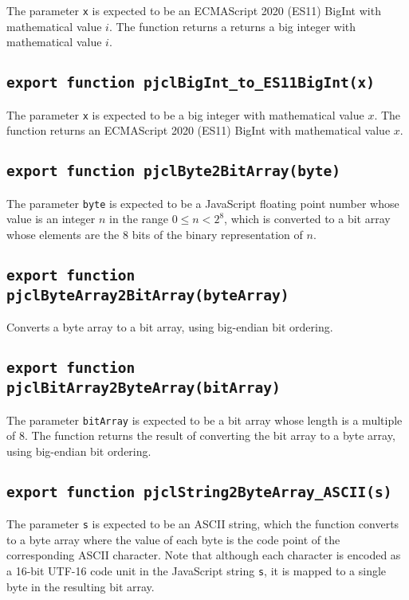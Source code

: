 \documentclass[12pt]{article}
\begin{document}
The parameter {\tt x} is expected to be an ECMAScript 2020 (ES11) BigInt with
mathematical value $i$.
The function returns a returns a big integer with mathematical value $i$.

\subsection{\tt export function pjclBigInt\_to\_ES11BigInt(x)}

The parameter {\tt x} is expected to be a big integer with mathematical value $x$.
The function returns an ECMAScript 2020 (ES11) BigInt with mathematical value $x$.

\subsection{\tt export function pjclByte2BitArray(byte)}

The parameter {\tt byte} is expected to be a JavaScript floating point
number whose value is an integer $n$ in the range $0\leq n < 2^8$,
which is converted to a bit array whose elements are the 8 bits of the
binary representation of $n$.

\subsection{\tt export function pjclByteArray2BitArray(byteArray)}

Converts a byte array to a bit array, using big-endian bit ordering. 

\subsection{\tt export function pjclBitArray2ByteArray(bitArray)}

The parameter {\tt bitArray} is expected to be a bit array whose length
is a multiple of 8.  The function returns the result of converting the bit array to
a byte array, using big-endian bit ordering. 

\subsection{\tt export function pjclString2ByteArray\_ASCII(s)}

The parameter {\tt s} is expected to be an ASCII string, which the
function converts to a byte array where the value of each byte is the 
code point of the corresponding ASCII character.  Note that although 
each character is encoded as a 16-bit UTF-16 code unit in the JavaScript string {\tt s}, 
it is mapped to a single byte in the resulting bit array.
\end{document}
